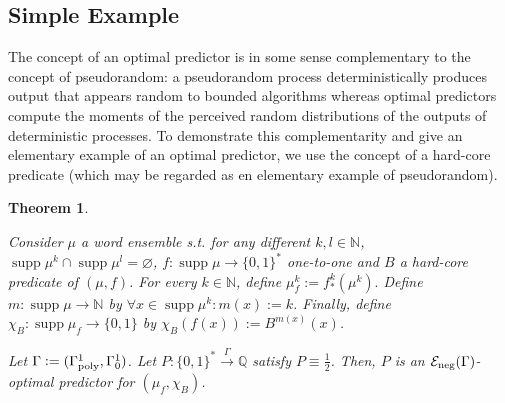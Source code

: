 \documentclass{article}
\numberwithin{equation}{section}
\theoremstyle{definition}
\theoremstyle{plain}
\newtheorem{theorem}{Theorem}[section]
\newcommand{\Bool}{\{0,1\}}
\newcommand{\Words}{{\Bool^*}}
\DeclareMathOperator{\Supp}{supp}
\newcommand{\Nats}{\mathbb{N}}
\newcommand{\Rats}{\mathbb{Q}}
\newcommand{\Fall}{\mathcal{E}}
\newcommand{\Scheme}{\xrightarrow{\Gamma}}
\begin{document}
\subsection{Simple Example}
\label{sec:fundamentals__one_way}

The concept of an optimal predictor is in some sense complementary to the concept of pseudorandom: a pseudorandom process deterministically produces output that appears random to bounded algorithms whereas optimal predictors compute the moments of the perceived random distributions of the outputs of deterministic processes. To demonstrate this complementarity and give an elementary example of an optimal predictor, we use the concept of a hard-core predicate (which may be regarded as en elementary example of pseudorandom).

\begin{theorem}
\label{thm:hard_core}

Consider $\mu$ a word ensemble s.t. for any different $k,l \in \Nats$, $\Supp \mu^k \cap \Supp \mu^l = \varnothing$, $f: \Supp \mu \rightarrow \Words$ one-to-one and $B$ a hard-core predicate of $(\mu,f)$. For every $k \in \Nats$, define $\mu_f^k:=f_*^k(\mu^k).$ Define ${m: \Supp \mu \rightarrow \Nats}$ by $\forall x \in \Supp \mu^k: m(x):=k$. Finally, define $\chi_B: \Supp \mu_f \rightarrow \Bool$ by ${\chi_B(f(x)):=B^{m(x)}(x)}$.

Let $\Gamma:=(\Gamma_{\textnormal{poly}}^1,\Gamma_0^1)$. Let $P: \Words \Scheme \Rats$ satisfy $P \equiv \frac{1}{2}$. Then, $P$ is an $\Fall_{\textnormal{neg}}(\Gamma)$-optimal predictor for $(\mu_f, \chi_B)$.

\end{theorem}
\end{document}
